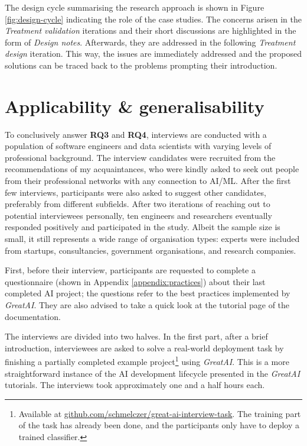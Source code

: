 The design cycle summarising the research approach is shown in Figure \ref{fig:design-cycle} indicating the role of the case studies. The concerns arisen in the \textit{Treatment validation} iterations and their short discussions are highlighted in the form of \textit{Design notes}. Afterwards, they are addressed in the following \textit{Treatment design} iteration. This way, the issues are immediately addressed and the proposed solutions can be traced back to the problems prompting their introduction.

\section{Applicability \& generalisability} \label{section:interview-setup}

To conclusively answer \textbf{RQ3} and \textbf{RQ4}, interviews are conducted with a population of software engineers and data scientists with varying levels of professional background. The interview candidates were recruited from the recommendations of my acquaintances, who were kindly asked to seek out people from their professional networks with any connection to AI/ML. After the first few interviews, participants were also asked to suggest other candidates, preferably from different subfields. After two iterations of reaching out to potential interviewees personally, ten engineers and researchers eventually responded positively and participated in the study. Albeit the sample size is small, it still represents a wide range of organisation types: experts were included from startups, consultancies, government organisations, and research companies.

First, before their interview, participants are requested to complete a questionnaire (shown in Appendix \ref{appendix:practices}) about their last completed AI project; the questions refer to the best practices implemented by \textit{GreatAI}. They are also advised to take a quick look at the tutorial page of the documentation. 

The interviews are divided into two halves. In the first part, after a brief introduction, interviewees are asked to solve a real-world deployment task by finishing a partially completed example project\footnote{Available at \href{https://github.com/schmelczer/great-ai-interview-task}{github.com/schmelczer/great-ai-interview-task}. The training part of the task has already been done, and the participants only have to deploy a trained classifier.} using \textit{GreatAI}. This is a more straightforward instance of the AI development lifecycle presented in the \textit{GreatAI} tutorials. The interviews took approximately one and a half hours each.

